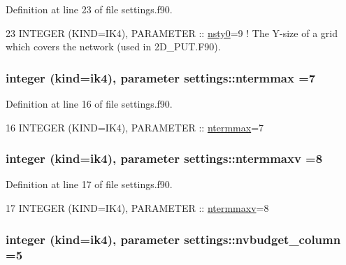 Definition at line 23 of file settings.\+f90.


\begin{DoxyCode}
23 \textcolor{keywordtype}{INTEGER (KIND=IK4)}, \textcolor{keywordtype}{PARAMETER}   :: \hyperlink{namespacesettings_a3989615b44f5121ea2e8761d6abc24e1}{nsty0}=9                  \textcolor{comment}{! The Y-size of a grid which covers the
       network (used in 2D\_PUT.F90).}
\end{DoxyCode}
\subsubsection[{\texorpdfstring{ntermmax}{ntermmax}}]{\setlength{\rightskip}{0pt plus 5cm}integer (kind=ik4), parameter settings\+::ntermmax =7}\hypertarget{namespacesettings_a3e7f9f832f20c3352f6a1c901bf3d13b}{}\label{namespacesettings_a3e7f9f832f20c3352f6a1c901bf3d13b}


Definition at line 16 of file settings.\+f90.


\begin{DoxyCode}
16 \textcolor{keywordtype}{INTEGER (KIND=IK4)}, \textcolor{keywordtype}{PARAMETER}   :: \hyperlink{namespacesettings_a3e7f9f832f20c3352f6a1c901bf3d13b}{ntermmax}=7
\end{DoxyCode}
\subsubsection[{\texorpdfstring{ntermmaxv}{ntermmaxv}}]{\setlength{\rightskip}{0pt plus 5cm}integer (kind=ik4), parameter settings\+::ntermmaxv =8}\hypertarget{namespacesettings_acb91032130faf4bb56bee66af8cbf573}{}\label{namespacesettings_acb91032130faf4bb56bee66af8cbf573}


Definition at line 17 of file settings.\+f90.


\begin{DoxyCode}
17 \textcolor{keywordtype}{INTEGER (KIND=IK4)}, \textcolor{keywordtype}{PARAMETER}   :: \hyperlink{namespacesettings_acb91032130faf4bb56bee66af8cbf573}{ntermmaxv}=8
\end{DoxyCode}
\subsubsection[{\texorpdfstring{nvbudget\+\_\+column}{nvbudget_column}}]{\setlength{\rightskip}{0pt plus 5cm}integer (kind=ik4), parameter settings\+::nvbudget\+\_\+column =5}\hypertarget{namespacesettings_a78876a80ce867f4bc71866b783b6de89}{}\label{namespacesettings_a78876a80ce867f4bc71866b783b6de89}


